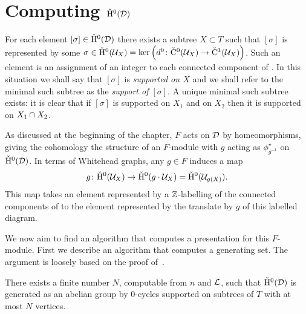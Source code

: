 \section{Computing \texorpdfstring{$\check{\mathrm{H}}{}^0(\mathcal{D})$}{H0(D,Z)}}\label{section:dimension_0_cohomology}

For each element $[\sigma] \in \check{\mathrm{H}}{}^0(\mathcal{D})$ there exists a subtree $X \subset T$ such that $[\sigma]$ is represented by some $\sigma \in \check{\mathrm{H}}{}^0(\mathcal{U}_X)= \ker\left( d^0 \colon \check{\mathrm{C}}{}^0(\mathcal{U}_X)\to \check{\mathrm{C}}{}^1(\mathcal{U}_X)\right)$.
Such an element is an assignment of an integer to each connected component of .
In this situation we shall say that $[\sigma]$ is \emph{supported on $X$} and we shall refer to the minimal such subtree as the \emph{support of $[\sigma]$}.
A unique minimal such subtree exists: it is clear that if $[\sigma]$ is supported on $X_1$ and on $X_2$ then it is supported on $X_1 \cap X_2$.

As discussed at the beginning of the chapter, $F$ acts on $\mathcal{D}$ by homeomorphisms, giving the \vCech{} cohomology the structure of an $F$-module with $g$ acting as $\phi_{g^{-1}}^\star$ on $\check{\mathrm{H}}{}^0(\mathcal{D})$.
In terms of Whitehead graphs, any $g\in F$ induces a map
\begin{align}
  g \colon \check{\mathrm{H}}{}^0(\mathcal{U}_X) \to \check{\mathrm{H}}{}^0(g\cdot\mathcal{U}_X)= \check{\mathrm{H}}{}^0(\mathcal{U}_{g(X)}).
\end{align}
This map takes an element represented by a $\mathbb{Z}$-labelling of the connected components of  to the element represented by the translate by $g$ of this labelled diagram.

We now aim to find an algorithm that computes a presentation for this $F$-module. First we describe an algorithm that computes a generating set.
The argument is loosely based on the proof of~\cite[Lemma 4.12]{cashenmacura11}.

\begin{proposition}\label{proposition:generators_0}
There exists a finite number $N$, computable from $n$ and $\mathcal{L}$, such that $\check{\mathrm{H}}{}^0(\mathcal{D})$ is generated as an abelian group by 0-cycles supported on subtrees of $T$ with at most $N$ vertices.
\end{proposition}

